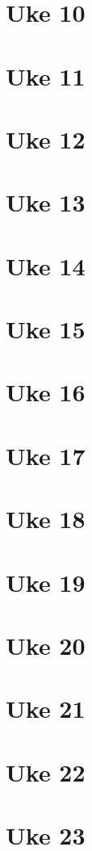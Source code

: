 \documentclass{article}
\begin{document}
  \section{Uke 10}
  \section{Uke 11}
  \section{Uke 12}
  \section{Uke 13}
  \section{Uke 14}
  \section{Uke 15}
  \section{Uke 16}
  \section{Uke 17}
  \section{Uke 18}
  \section{Uke 19}
  \section{Uke 20}
  \section{Uke 21}
  \section{Uke 22}
  \section{Uke 23}
\end{document}
